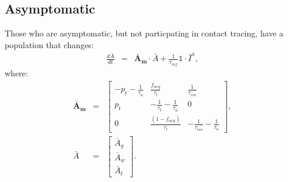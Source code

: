\documentclass[notitlepage, superscriptaddress]{revtex4-2}
\begin{document}
\subsection{Asymptomatic}
Those who are asymptomatic, but not particpating in contact tracing, have a population that changes:
\begin{eqnarray}
\frac{d\bar{A}}{dt} &=& \boldsymbol{\bar{A}_{m}} \cdot  \bar{A} + \frac{1}{\tau_{inf}} \mathbb{1} \cdot  \bar{I}^{a}, 
\end{eqnarray}
where:
%
\begin{eqnarray}
\boldsymbol{\bar{A}_{m}} &=&
\begin{bmatrix}
- p_{t} -\frac{1}{\tau_{a}}  &  \frac{f_{neg}}{\tau_{t}}            & \frac{1}{\tau_{iso}} \\ 
 p_{t}              & -\frac{1}{\tau_{t}} -\frac{1}{\tau_{a}}       & 0  \\ 
 0                  & \frac{(1- f_{neg})}{\tau_{t}}                        & -\frac{1}{\tau_{iso}} -\frac{1}{\tau_{a}}
\end{bmatrix}, \\ 
%
\bar{A} &=& 
\begin{bmatrix}
\bar{A}_{g} \\ \bar{A}_{w}\\ \bar{A}_{t}
\end{bmatrix}. \\ 
%
\end{eqnarray}
\end{document}
